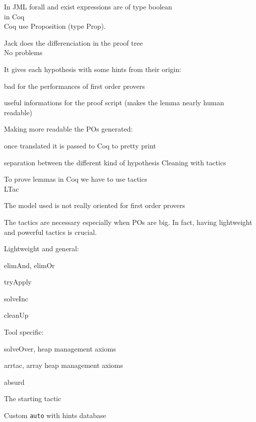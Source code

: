 \small
In JML forall and exist expressions are of type boolean\\
 in Coq\\
Coq use Proposition (type Prop).
\blist
\item Jack does the differenciation in the proof tree \\
\rarrow No problems
\elist




It gives each hypothesis with some {\purple hints} from their origin:
\blist \small
\item bad for the performances of first order provers
\item useful informations for the proof script (makes the lemma
nearly human readable)
\elist

Making more readable the POs generated:

\blist \small
\item once translated it is passed to Coq  to {\purple pretty print}
\item separation between the different kind of hypothesis
\elist 
\rarrow Cleaning with tactics


To prove lemmas in Coq we have to use tactics \\
\rarrow LTac
\blist \small
\item The model used is not really oriented for
first order provers
\item The tactics are necessary especially when POs are big.
\elist
In fact, having {\purple lightweight} and {\purple powerful} 
tactics is crucial.


\blist
\item Lightweight and general:
\blist \small \item elimAnd, elimOr
\item tryApply
\item solveInc
\item cleanUp
\elist
\item Tool specific:
\blist \small
\item solveOver, heap management axioms
\item arrtac, array heap management axioms
\item absurd
\elist
\item The starting tactic
\item Custom {\tt auto} with {\purple hints database}
\elist
{}

